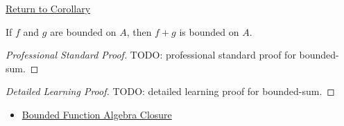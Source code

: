 \newpage
{}
\label{prf:bounded-sum}

\begin{remark*}[Return]
\hyperref[cor:bounded-sum]{Return to Corollary}
\end{remark*}

\begin{corollary*}
If \(f\) and \(g\) are bounded on \(A\), then \(f+g\) is bounded on \(A\).
\end{corollary*}

\begin{proof}[Professional Standard Proof]
\LRAProofBodyStart
TODO: professional standard proof for bounded-sum.
\end{proof}

\begin{proof}[Detailed Learning Proof]
\LRAProofBodyStart
TODO: detailed learning proof for bounded-sum.
\end{proof}

\begin{remark*}
\end{remark*}

\begin{dependencies}
\begin{itemize}
  \item \hyperref[thm:bounded-function-algebra-closure]{Bounded Function Algebra Closure}
\end{itemize}
\end{dependencies}

\clearpage
